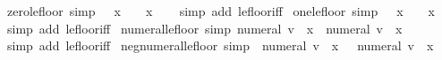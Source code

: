 \begin{isabellebody}
\ zero{\isacharunderscore}{\kern0pt}le{\isacharunderscore}{\kern0pt}floor\ {\isacharbrackleft}{\kern0pt}simp{\isacharbrackright}{\kern0pt}{\isacharcolon}{\kern0pt}\ {\isachardoublequoteopen}{}\ {\isasymle}\ {\isasymlfloor}x{\isasymrfloor}\ {\isasymlongleftrightarrow}\ {}\ {\isasymle}\ x{\isachardoublequoteclose}\isanewline
%
\isadelimproof
\ \ %
\endisadelimproof
%
\isatagproof
{}\isamarkupfalse%
\ {\isacharparenleft}{\kern0pt}simp\ add{\isacharcolon}{\kern0pt}\ le{\isacharunderscore}{\kern0pt}floor{\isacharunderscore}{\kern0pt}iff{\isacharparenright}{\kern0pt}%
\endisatagproof
{\isafoldproof}%
%
\isadelimproof
\isanewline
%
\endisadelimproof
\isanewline
{}\isamarkupfalse%
\ one{\isacharunderscore}{\kern0pt}le{\isacharunderscore}{\kern0pt}floor\ {\isacharbrackleft}{\kern0pt}simp{\isacharbrackright}{\kern0pt}{\isacharcolon}{\kern0pt}\ {\isachardoublequoteopen}{}\ {\isasymle}\ {\isasymlfloor}x{\isasymrfloor}\ {\isasymlongleftrightarrow}\ {}\ {\isasymle}\ x{\isachardoublequoteclose}\isanewline
%
\isadelimproof
\ \ %
\endisadelimproof
%
\isatagproof
{}\isamarkupfalse%
\ {\isacharparenleft}{\kern0pt}simp\ add{\isacharcolon}{\kern0pt}\ le{\isacharunderscore}{\kern0pt}floor{\isacharunderscore}{\kern0pt}iff{\isacharparenright}{\kern0pt}%
\endisatagproof
{\isafoldproof}%
%
\isadelimproof
\isanewline
%
\endisadelimproof
\isanewline
{}\isamarkupfalse%
\ numeral{\isacharunderscore}{\kern0pt}le{\isacharunderscore}{\kern0pt}floor\ {\isacharbrackleft}{\kern0pt}simp{\isacharbrackright}{\kern0pt}{\isacharcolon}{\kern0pt}\ {\isachardoublequoteopen}numeral\ v\ {\isasymle}\ {\isasymlfloor}x{\isasymrfloor}\ {\isasymlongleftrightarrow}\ numeral\ v\ {\isasymle}\ x{\isachardoublequoteclose}\isanewline
%
\isadelimproof
\ \ %
\endisadelimproof
%
\isatagproof
{}\isamarkupfalse%
\ {\isacharparenleft}{\kern0pt}simp\ add{\isacharcolon}{\kern0pt}\ le{\isacharunderscore}{\kern0pt}floor{\isacharunderscore}{\kern0pt}iff{\isacharparenright}{\kern0pt}%
\endisatagproof
{\isafoldproof}%
%
\isadelimproof
\isanewline
%
\endisadelimproof
\isanewline
{}\isamarkupfalse%
\ neg{\isacharunderscore}{\kern0pt}numeral{\isacharunderscore}{\kern0pt}le{\isacharunderscore}{\kern0pt}floor\ {\isacharbrackleft}{\kern0pt}simp{\isacharbrackright}{\kern0pt}{\isacharcolon}{\kern0pt}\ {\isachardoublequoteopen}{\isacharminus}{\kern0pt}\ numeral\ v\ {\isasymle}\ {\isasymlfloor}x{\isasymrfloor}\ {\isasymlongleftrightarrow}\ {\isacharminus}{\kern0pt}\ numeral\ v\ {\isasymle}\ x{\isachardoublequoteclose}\isanewline

\end{isabellebody}
